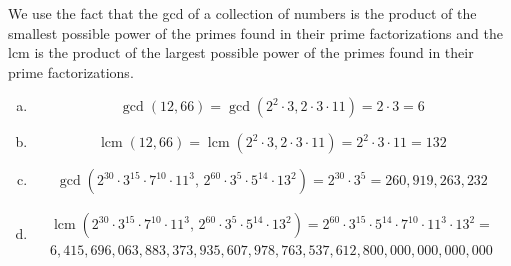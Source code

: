 \documentclass[11pt,letterpaper]{article}
\DeclareMathOperator{\lcm}{lcm}
\begin{document}
\sol We use the fact that the gcd of a collection of numbers is the product of the smallest possible power of the primes found in their prime factorizations and the lcm is the product of the largest possible power of the primes found in their prime factorizations.  

\begin{enumerate}[(a)]
\item 
	\[
	\gcd(12, 66)= \gcd(2^2 \cdot 3, 2 \cdot 3 \cdot 11)= 2 \cdot 3= 6
	\] \pspace

\item 
	\[
	\lcm(12, 66)= \lcm(2^2 \cdot 3, 2 \cdot 3 \cdot 11)= 2^2 \cdot 3 \cdot 11= 132
	\] \pspace
	
\item 
	\[
	\gcd(2^{30} \cdot 3^{15} \cdot 7^{10} \cdot 11^3,\, 2^{60} \cdot 3^{5} \cdot 5^{14} \cdot 13^2)= 2^{30} \cdot 3^5= 260,\!919,\!263,\!232
	\] \pspace

\item 
	\[
	\begin{gathered}
	\lcm(2^{30} \cdot 3^{15} \cdot 7^{10} \cdot 11^3,\, 2^{60} \cdot 3^{5} \cdot 5^{14} \cdot 13^2)= 2^{60} \cdot 3^{15} \cdot 5^{14} \cdot 7^{10} \cdot 11^3 \cdot 13^2= \\
	6,\!415,\!696,\!063,\!883,\!373,\!935,\!607,\!978,\!763,\!537,\!612,\!800,\!000,\!000,\!000,\!000
	\end{gathered}
	\]
\end{enumerate}
\end{document}
